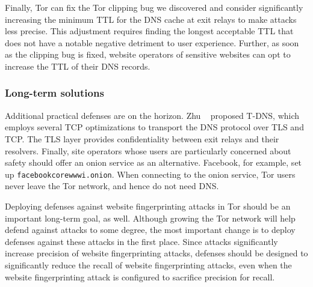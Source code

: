 Finally, Tor can fix the Tor clipping bug we discovered and consider
significantly increasing the minimum TTL for the DNS cache at exit relays to
make \name attacks less precise.  This adjustment requires finding the longest
acceptable TTL that does not have a notable negative detriment to user
experience.  Further, as soon as the clipping bug is fixed, website operators
of sensitive websites can opt to increase the TTL of their DNS records.

\subsubsection{Long-term solutions}
\label{sec:long-term}

Additional practical defenses are on the horizon.  Zhu \ea~\cite{Zhu2015a}
proposed T-DNS, which employs several TCP optimizations to transport the DNS
protocol over TLS and TCP.  The TLS layer provides confidentiality between exit
relays and their resolvers.  Finally, site operators whose users are
particularly concerned about safety should offer an onion service as an
alternative.  Facebook, for example, set up {\tt facebookcorewwwi.onion}.  When
connecting to the onion service, Tor users never leave the Tor network, and
hence do not need DNS.

Deploying defenses against website fingerprinting attacks in Tor should be an
important long-term goal, as well.
Although growing the Tor network will help defend against \name attacks to some
degree, the most important change is to
deploy defenses against these attacks in the first place.  Since \name attacks
significantly increase precision of website fingerprinting attacks, defenses
should be designed to significantly reduce the recall of website fingerprinting
attacks, even when the website fingerprinting attack is configured to sacrifice
precision for recall.
